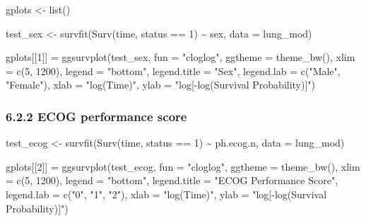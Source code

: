 \documentclass[
]{article}
\newenvironment{Shaded}{\begin{snugshade}}{\end{snugshade}}
\newcommand{\AttributeTok}[1]{\textcolor[rgb]{0.77,0.63,0.00}{#1}}
\newcommand{\DecValTok}[1]{\textcolor[rgb]{0.00,0.00,0.81}{#1}}
\newcommand{\FunctionTok}[1]{\textcolor[rgb]{0.00,0.00,0.00}{#1}}
\newcommand{\NormalTok}[1]{#1}
\newcommand{\OtherTok}[1]{\textcolor[rgb]{0.56,0.35,0.01}{#1}}
\newcommand{\SpecialCharTok}[1]{\textcolor[rgb]{0.00,0.00,0.00}{#1}}
\newcommand{\StringTok}[1]{\textcolor[rgb]{0.31,0.60,0.02}{#1}}
\begin{document}
\begin{Shaded}
\begin{Highlighting}[]
\NormalTok{gplots }\OtherTok{\textless{}{-}} \FunctionTok{list}\NormalTok{()}

\NormalTok{test\_sex }\OtherTok{\textless{}{-}} \FunctionTok{survfit}\NormalTok{(}\FunctionTok{Surv}\NormalTok{(time, status }\SpecialCharTok{==} \DecValTok{1}\NormalTok{) }\SpecialCharTok{\textasciitilde{}}\NormalTok{ sex, }\AttributeTok{data =}\NormalTok{ lung\_mod)}

\NormalTok{gplots[[}\DecValTok{1}\NormalTok{]] }\OtherTok{=} \FunctionTok{ggsurvplot}\NormalTok{(test\_sex, }
           \AttributeTok{fun =} \StringTok{"cloglog"}\NormalTok{,}
           \AttributeTok{ggtheme =} \FunctionTok{theme\_bw}\NormalTok{(), }
           \AttributeTok{xlim =} \FunctionTok{c}\NormalTok{(}\DecValTok{5}\NormalTok{, }\DecValTok{1200}\NormalTok{),}
           \AttributeTok{legend =} \StringTok{"bottom"}\NormalTok{, }
           \AttributeTok{legend.title =} \StringTok{"Sex"}\NormalTok{,}
           \AttributeTok{legend.lab =} \FunctionTok{c}\NormalTok{(}\StringTok{"Male"}\NormalTok{, }\StringTok{"Female"}\NormalTok{),}
           \AttributeTok{xlab =} \StringTok{"log(Time)"}\NormalTok{,}
           \AttributeTok{ylab =} \StringTok{"log[{-}log(Survival Probability)]"}\NormalTok{)}
\end{Highlighting}
\end{Shaded}

\hypertarget{ecog-performance-score-1}{%
\subsubsection{6.2.2 ECOG performance
score}\label{ecog-performance-score-1}}

\begin{Shaded}
\begin{Highlighting}[]
\NormalTok{test\_ecog }\OtherTok{\textless{}{-}} \FunctionTok{survfit}\NormalTok{(}\FunctionTok{Surv}\NormalTok{(time, status }\SpecialCharTok{==} \DecValTok{1}\NormalTok{) }\SpecialCharTok{\textasciitilde{}}\NormalTok{ ph.ecog.n, }\AttributeTok{data =}\NormalTok{ lung\_mod)}

\NormalTok{gplots[[}\DecValTok{2}\NormalTok{]] }\OtherTok{=} \FunctionTok{ggsurvplot}\NormalTok{(test\_ecog, }
           \AttributeTok{fun =} \StringTok{"cloglog"}\NormalTok{,}
           \AttributeTok{ggtheme =} \FunctionTok{theme\_bw}\NormalTok{(),}
           \AttributeTok{xlim =} \FunctionTok{c}\NormalTok{(}\DecValTok{5}\NormalTok{, }\DecValTok{1200}\NormalTok{),}
           \AttributeTok{legend =} \StringTok{"bottom"}\NormalTok{, }
           \AttributeTok{legend.title =} \StringTok{"ECOG Performance Score"}\NormalTok{,}
           \AttributeTok{legend.lab =} \FunctionTok{c}\NormalTok{(}\StringTok{"0"}\NormalTok{, }\StringTok{"1"}\NormalTok{, }\StringTok{"2"}\NormalTok{),}
           \AttributeTok{xlab =} \StringTok{"log(Time)"}\NormalTok{,}
           \AttributeTok{ylab =} \StringTok{"log[{-}log(Survival Probability)]"}\NormalTok{)}
\end{Highlighting}
\end{Shaded}
\end{document}
